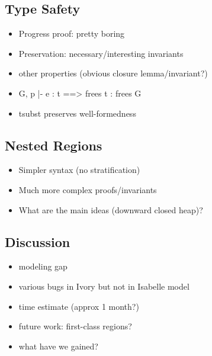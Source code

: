 \subsection{Type Safety}

\begin{itemize}
\item Progress proof: pretty boring
\item Preservation: necessary/interesting invariants
\item other properties (obvious closure lemma/invariant?)
\item G, p |- e : t ==> frees t : frees G
\item tsubst preserves well-formedness
\end{itemize}

\subsection{Nested Regions}

\begin{itemize}
\item Simpler syntax (no stratification)
\item Much more complex proofs/invariants
\item What are the main ideas (downward closed heap)?
\end{itemize}

\subsection{Discussion}

\begin{itemize}
\item modeling gap
\item various bugs in Ivory but not in Isabelle model
\item time estimate (approx 1 month?)
\item future work: first-class regions?
\item what have we gained?
\end{itemize}











